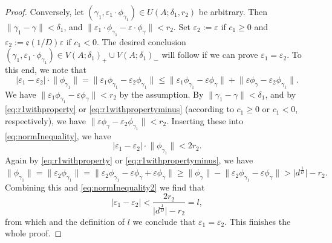 \documentclass[10pt,a4paper]{amsart}
\newcommand*\abs[1]{\lvert#1\rvert}
\newcommand\etp[1]{\mathfrak{e}\left(#1\right)}
\begin{document}
\begin{proof}
Conversely, let $(\gamma_1,\varepsilon_1\cdot\phi_{\gamma_1})\in U(A;\delta_1,r_2)$ be arbitrary. Then $\lVert\gamma_1-\gamma\rVert<\delta_1$, and $\lVert\varepsilon_1\cdot\phi_{\gamma_1}-\varepsilon\cdot\phi_{\gamma}\rVert<r_2$. Set $\varepsilon_2:=\varepsilon$ if $c_1\geq0$ and $\varepsilon_2:=\etp{1/D}\varepsilon$ if $c_1<0$. The desired conclusion $(\gamma_1,\varepsilon_1\cdot\phi_{\gamma_1})\in V(A;\delta_1)_{+}\cup V(A;\delta_1)_{-}$ will follow if we can prove $\varepsilon_1=\varepsilon_2$. To this end, we note that
\begin{equation}
\label{eq:normInequality}
\abs{\varepsilon_1-\varepsilon_2}\cdot\lVert\phi_{\gamma_1}\rVert=\lVert\varepsilon_1\phi_{\gamma_1}-\varepsilon_2\phi_{\gamma_1}\rVert\leq\lVert\varepsilon_1\phi_{\gamma_1}-\varepsilon\phi_{\gamma}\rVert+\lVert\varepsilon\phi_{\gamma}-\varepsilon_2\phi_{\gamma_1}\rVert.
\end{equation}
We have $\lVert\varepsilon_1\phi_{\gamma_1}-\varepsilon\phi_{\gamma}\rVert<r_2$ by the assumption. By $\lVert\gamma_1-\gamma\rVert<\delta_1$, and by \eqref{eq:r1withproperty} or \eqref{eq:r1withpropertyminus} (according to $c_1\geq0$ or $c_1<0$, respectively), we have $\lVert\varepsilon\phi_{\gamma}-\varepsilon_2\phi_{\gamma_1}\rVert<r_2$. Inserting these into \eqref{eq:normInequality}, we have
\begin{equation}
\label{eq:normInequality2}
\abs{\varepsilon_1-\varepsilon_2}\cdot\lVert\phi_{\gamma_1}\rVert<2r_2.
\end{equation}
Again by \eqref{eq:r1withproperty} or \eqref{eq:r1withpropertyminus}, we have
$$\lVert\phi_{\gamma_1}\rVert=\lVert\varepsilon_2\phi_{\gamma_1}\rVert=\lVert\varepsilon_2\phi_{\gamma_1}-\varepsilon\phi_\gamma+\varepsilon\phi_\gamma\rVert\geq\lVert\phi_\gamma\rVert-\lVert\varepsilon_2\phi_{\gamma_1}-\varepsilon\phi_\gamma\rVert>\abs{d^{\frac{1}{D}}}-r_2.$$
Combining this and \eqref{eq:normInequality2} we find that
\begin{equation}
\label{eq:normInequality3}
\abs{\varepsilon_1-\varepsilon_2}<\frac{2r_2}{\abs{d^{\frac{1}{D}}}-r_2}=l,
\end{equation}
from which and the definition of $l$ we conclude that $\varepsilon_1=\varepsilon_2$. This finishes the whole proof.
\end{proof}
\end{document}
